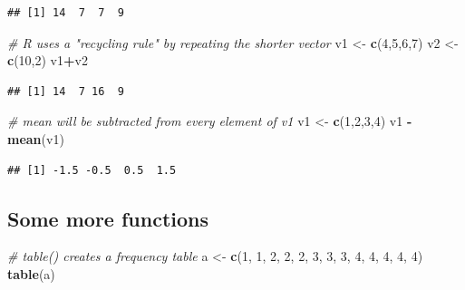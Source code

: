 \documentclass[]{book}
\newenvironment{Shaded}{\begin{snugshade}}{\end{snugshade}}
\newcommand{\CommentTok}[1]{\textcolor[rgb]{0.56,0.35,0.01}{\textit{#1}}}
\newcommand{\DecValTok}[1]{\textcolor[rgb]{0.00,0.00,0.81}{#1}}
\newcommand{\KeywordTok}[1]{\textcolor[rgb]{0.13,0.29,0.53}{\textbf{#1}}}
\newcommand{\NormalTok}[1]{#1}
\newcommand{\OperatorTok}[1]{\textcolor[rgb]{0.81,0.36,0.00}{\textbf{#1}}}
\newcommand{\StringTok}[1]{\textcolor[rgb]{0.31,0.60,0.02}{#1}}
\begin{document}
\begin{verbatim}
## [1] 14  7  7  9
\end{verbatim}

\begin{Shaded}
\begin{Highlighting}[]
\CommentTok{# R uses a "recycling rule" by repeating the shorter vector}
\NormalTok{v1 <-}\StringTok{ }\KeywordTok{c}\NormalTok{(}\DecValTok{4}\NormalTok{,}\DecValTok{5}\NormalTok{,}\DecValTok{6}\NormalTok{,}\DecValTok{7}\NormalTok{)}
\NormalTok{v2 <-}\StringTok{ }\KeywordTok{c}\NormalTok{(}\DecValTok{10}\NormalTok{,}\DecValTok{2}\NormalTok{)}
\NormalTok{v1}\OperatorTok{+}\NormalTok{v2}
\end{Highlighting}
\end{Shaded}

\begin{verbatim}
## [1] 14  7 16  9
\end{verbatim}

\begin{Shaded}
\begin{Highlighting}[]
\CommentTok{# mean will be subtracted from every element of v1}
\NormalTok{v1 <-}\StringTok{ }\KeywordTok{c}\NormalTok{(}\DecValTok{1}\NormalTok{,}\DecValTok{2}\NormalTok{,}\DecValTok{3}\NormalTok{,}\DecValTok{4}\NormalTok{)}
\NormalTok{v1 }\OperatorTok{-}\StringTok{ }\KeywordTok{mean}\NormalTok{(v1)}
\end{Highlighting}
\end{Shaded}

\begin{verbatim}
## [1] -1.5 -0.5  0.5  1.5
\end{verbatim}

\hypertarget{some-more-functions}{%
\subsection{Some more functions}\label{some-more-functions}}

\begin{Shaded}
\begin{Highlighting}[]
\CommentTok{# table() creates a frequency table}
\NormalTok{a <-}\StringTok{ }\KeywordTok{c}\NormalTok{(}\DecValTok{1}\NormalTok{, }\DecValTok{1}\NormalTok{, }\DecValTok{2}\NormalTok{, }\DecValTok{2}\NormalTok{, }\DecValTok{2}\NormalTok{, }\DecValTok{3}\NormalTok{, }\DecValTok{3}\NormalTok{, }\DecValTok{3}\NormalTok{, }\DecValTok{4}\NormalTok{, }\DecValTok{4}\NormalTok{, }\DecValTok{4}\NormalTok{, }\DecValTok{4}\NormalTok{, }\DecValTok{4}\NormalTok{)}
\KeywordTok{table}\NormalTok{(a)}
\end{Highlighting}
\end{Shaded}
\end{document}
